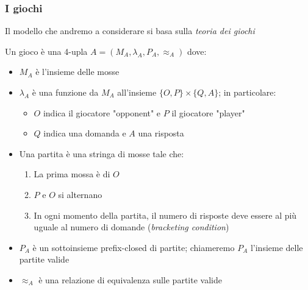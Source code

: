 \documentclass{beamer}
\begin{document}
\begin{frame}
	\frametitle{I giochi}
	
	Il modello che andremo a considerare si basa sulla \emph{teoria dei giochi}
	
	
	Un gioco è una 4-upla $A=( M_A , \lambda_A , P_A , \approx_A )$ dove:
	\begin{itemize}
	\item $M_A$ è l'insieme delle mosse
	\item $\lambda_A$ è una funzione da $M_A$ all'insieme $\{ O,P\} \times \{Q,A\}$; in particolare:
		\begin{itemize}
		\item $O$ indica il giocatore "opponent" e $P$ il giocatore "player"
		\item $Q$ indica una domanda e $A$ una risposta
		\end{itemize}
	\item Una partita è una stringa di mosse tale che:
		\begin{enumerate}
		\item La prima mossa è di $O$
		\item $P$ e $O$ si alternano
		\item In ogni momento della partita, il numero di risposte deve essere al più uguale al numero di domande (\emph{bracketing condition})
		\end{enumerate}
	\item $P_A$ è un sottoinsieme prefix-closed di partite; chiameremo $P_A$ l'insieme delle partite valide
	\item  $\approx_A$ è una relazione di equivalenza sulle partite valide
	\end{itemize}
	
	
\end{frame}
\end{document}

